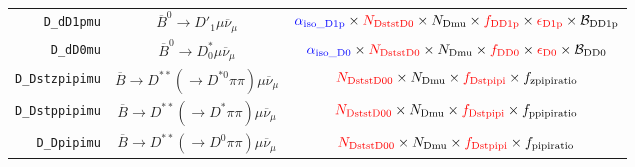\begin{landscape}
\begin{table}
\begin{tabular}{r|c|c}
       \texttt{D\_dD1pmu} &               $\overline{B}^0 \rightarrow D'_1 \mu \overline{\nu}_\mu$               &                                                                            $\textcolor{blue}{\alpha_\text{iso\_D1p}} \times \textcolor{red}{N_\text{DststD0}} \times N_\text{Dmu} \times \textcolor{red}{f_\text{DD1p}} \times \textcolor{red}{\epsilon_\text{D1p}} \times \mathcal{B}_\text{DD1p}$                                                                            \\
        \texttt{D\_dD0mu} &              $\overline{B}^0 \rightarrow D^*_0 \mu \overline{\nu}_\mu$               &                                                                              $\textcolor{blue}{\alpha_\text{iso\_D0}} \times \textcolor{red}{N_\text{DststD0}} \times N_\text{Dmu} \times \textcolor{red}{f_\text{DD0}} \times \textcolor{red}{\epsilon_\text{D0}} \times \mathcal{B}_\text{DD0}$                                                                              \\
   \texttt{D\_Dstzpipimu} & $\overline{B} \rightarrow D^{**} (\rightarrow D^{*0} \pi\pi) \mu \overline{\nu}_\mu$ &                                                                                                                          $\textcolor{red}{N_\text{DststD00}} \times N_\text{Dmu} \times \textcolor{red}{f_\text{Dstpipi}} \times f_\text{zpipiratio}$                                                                                                                          \\
   \texttt{D\_Dstppipimu} &  $\overline{B} \rightarrow D^{**} (\rightarrow D^* \pi\pi) \mu \overline{\nu}_\mu$   &                                                                                                                          $\textcolor{red}{N_\text{DststD00}} \times N_\text{Dmu} \times \textcolor{red}{f_\text{Dstpipi}} \times f_\text{ppipiratio}$                                                                                                                          \\
      \texttt{D\_Dpipimu} &  $\overline{B} \rightarrow D^{**} (\rightarrow D^0 \pi\pi) \mu \overline{\nu}_\mu$   &                                                                                                                          $\textcolor{red}{N_\text{DststD00}} \times N_\text{Dmu} \times \textcolor{red}{f_\text{Dstpipi}} \times f_\text{pipiratio}$                                                                                                                           \\

\end{tabular}
\end{table}
\end{landscape}
